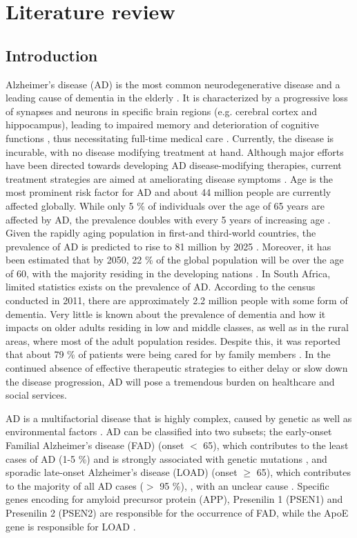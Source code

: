 \chapter{Literature review}
\label{sec:chapter1}
\section{Introduction}
Alzheimer’s disease (AD) is the most common neurodegenerative disease and a leading cause of dementia in the elderly \citep{andrieu2015}. It is characterized by a progressive loss of synapses and neurons in specific brain regions (e.g. cerebral cortex and hippocampus), leading to impaired memory and deterioration of cognitive functions \citep{dekosky1990,scheff2006,zare-shahabadi2015}, thus necessitating full-time medical care \citep{prince2013}. Currently, the disease is incurable, with no disease modifying treatment at hand. Although major efforts have been directed towards developing AD disease-modifying therapies, current treatment strategies are aimed at ameliorating disease symptoms \citep{anand2014,disanto2013}. Age is the most prominent risk factor for AD and about 44 million people are currently affected globally. While only 5 \% of individuals over the age of 65 years are affected by AD, the prevalence doubles with every 5 years of increasing age \citep{pimenova2018,qiu2009}. Given the rapidly aging population in first-and third-world countries, the prevalence of AD is predicted to rise to 81 million by 2025 \citep{AlzheimersAssociation2014,Ferri2005}. Moreover, it has been estimated that by 2050, 22 \% of the global population will be over the age of 60, with the majority residing in the developing nations \citep{Annear2015,Paddick2013}. In South Africa, limited statistics exists on the prevalence of AD. According to the census conducted in 2011, there are approximately 2.2 million people with some form of dementia. Very little is known about the prevalence of dementia and how it impacts on older adults residing in low and middle classes, as well as in the rural areas, where most of the adult population resides. Despite this, it was reported that about 79 \% of patients were being cared for by family members \citep{Kalula2010}. In the continued absence of effective therapeutic strategies to either delay or slow down the disease progression, AD will pose a tremendous burden on healthcare and social services. 

AD is a multifactorial disease that is highly complex, caused by genetic as well as environmental factors \citep{Dorszewska2016}. AD can be classified into two subsets; the early-onset Familial Alzheimer’s disease (FAD) (onset $<$ 65), which contributes to the least cases of AD (1-5 \%) and is strongly associated with genetic mutations \citep{Musiek2015,Reitz2014,Swerdlow2007}, and sporadic late-onset Alzheimer’s disease (LOAD) (onset $\geq$ 65), which contributes to the majority of all AD cases ($>$ 95 \%), \citep{Musiek2015,Reitz2014,Swerdlow2007}, with an unclear cause \citep{Dorszewska2016,pimenova2018}. Specific genes encoding for amyloid precursor protein (APP), Presenilin 1 (PSEN1) and Presenilin 2  (PSEN2) are responsible for the occurrence of FAD, while the ApoE gene is responsible for LOAD \citep{Dorszewska2016}.

